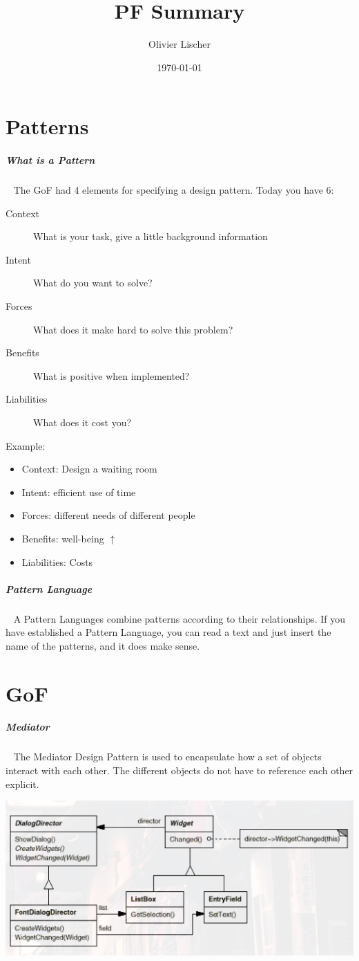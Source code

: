 \documentclass[11pt,twoside,landscape]{article}
\author{Olivier Lischer}
\date{\today}
\title{PF Summary}
\begin{document}
\pagestyle{fancy}
\fancyhf{}
\fancyfoot[CE,CO]{\leftmark}
\fancyfoot[R]{\thepage}

\tableofcontents
\newpage

\begin{multicols}{3}
\section{Patterns}
\label{sec:orgb03538d}
\subparagraph{What is a Pattern} \
\label{sec:orga345d4e}
The GoF had 4 elements for specifying a design pattern.
Today you have 6:
\begin{description}
\item[{Context}] What is your task, give a little background information
\item[{Intent}] What do you want to solve?
\item[{Forces}] What does it make hard to solve this problem?
\item[{Benefits}] What is positive when implemented?
\item[{Liabilities}] What does it cost you?
\end{description}


Example:
\begin{itemize}
\item Context: Design a waiting room
\item Intent: efficient use of time
\item Forces: different needs of different people
\item Benefits: well-being \(\uparrow\)
\item Liabilities: Costs
\end{itemize}
\subparagraph{Pattern Language} \
\label{sec:orgd647590}
A Pattern Languages combine patterns according to their relationships.
If you have established a Pattern Language, you can read a text and just insert the name of the patterns, and it does make sense.
\section{GoF}
\label{sec:org1acd697}
\subparagraph{Mediator} \
\label{sec:org92dd46b}
The Mediator Design Pattern is used to encapsulate how a set of objects interact with each other.
The different objects do not have to reference each other explicit.

{
\begin{center}
\includegraphics[width=.9\linewidth]{img/mediator.png}
\end{center}
\label{fig:mediator-class-diagram}
}


\end{multicols}
\end{document}
